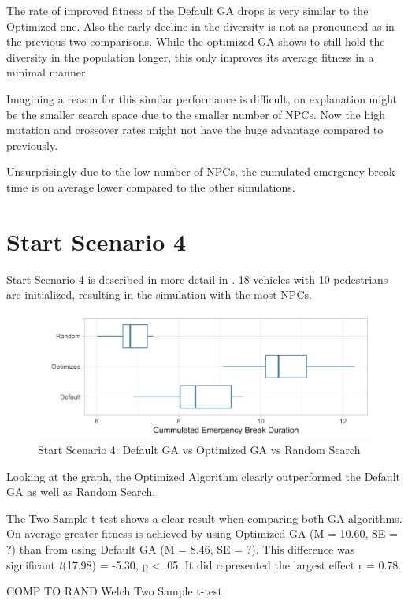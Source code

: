 The rate of improved fitness of the Default GA drops is very similar to the Optimized one. Also the early decline in the diversity is not as pronounced as in the previous two comparisons. While the optimized GA shows to still hold the diversity in the population longer, this only improves its average fitness in a minimal manner.

Imagining a reason for this similar performance is difficult, on explanation might be the smaller search space due to the smaller number of NPCs. Now the high mutation and crossover rates might not have the huge advantage compared to previously.

Unsurprisingly due to the low number of NPCs, the cumulated emergency break time is on average lower compared to the other simulations.

\section{Start Scenario 4}
Start Scenario 4 is described in more detail in . 18 vehicles with 10 pedestrians are initialized, resulting in the simulation with the most NPCs.

\begin{figure}[ht] 
	\label{figure:sim_4_comparison}
	\includegraphics[width=1\linewidth]{simulations/evaluation/plots/sim_4_comparison}
	\caption{Start Scenario 4: Default GA vs Optimized GA vs Random Search}
\end{figure}

Looking at the graph, the Optimized Algorithm clearly outperformed the Default GA as well as Random Search.

The Two Sample t-test shows a clear result when comparing both GA algorithms. On average greater fitness is achieved by using Optimized GA (M = 10.60, SE = ?) than from using Default GA (M = 8.46, SE = ?). This difference was significant \textit{t}(17.98) = -5.30, p < .05. It did represented the largest effect r = 0.78.

COMP TO RAND
	Welch Two Sample t-test

